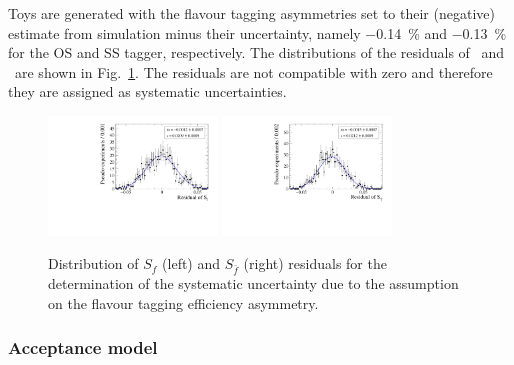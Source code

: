 Toys are generated with the flavour tagging asymmetries set to their (negative) estimate from simulation minus their
uncertainty, namely \SI{-0.14}{\percent} and \SI{-0.13}{\percent} for the OS and SS tagger, respectively.
The distributions of the residuals of \Sf~and \Sfb~are shown in Fig.~\ref{fig:FTEffAsym}. The residuals are not compatible with
zero and therefore they are assigned as systematic uncertainties.
\begin{figure}[t]
	\begin{center}
		\includegraphics[width=0.4\textwidth]{06Systematics/figs/FTeffAsym_Sf_res.pdf}
		\includegraphics[width=0.4\textwidth]{06Systematics/figs/FTeffAsym_Sfbar_res.pdf}
	\end{center}
        \vspace{-2mm}
	\caption{Distribution of $S_f$ (left) and $S_{\bar f}$ (right) residuals for the determination of the systematic uncertainty due to the assumption on
	the flavour tagging efficiency asymmetry.}
	\label{fig:FTEffAsym}
\end{figure}

\subsubsection{Acceptance model}
\label{sec:syst_toys_acceptancemodel}

